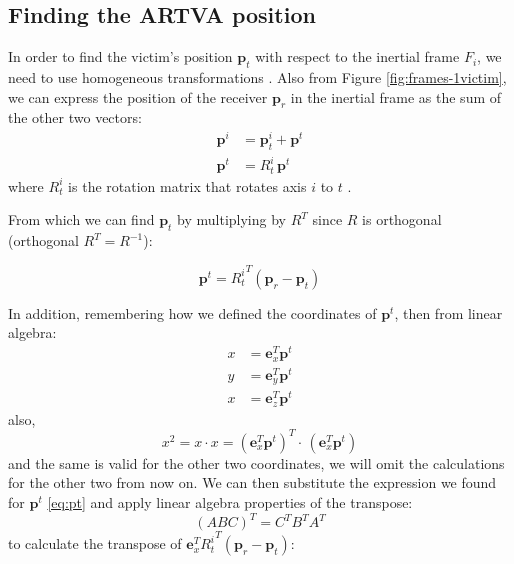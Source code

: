 \subsection{Finding the ARTVA position}
In order to find the victim's position $\mathbf{p}_t$ with respect to the inertial frame $F_i$, we need to use homogeneous transformations \cite{book-robotics}. Also from Figure \ref{fig:frames-1victim}, we can express the position of the receiver $\mathbf{p}_r$ in the inertial frame as the sum of the other two vectors:
\[
\begin{aligned}
\mathbf{p}^i &= \mathbf{p}_t^i + \mathbf{p}^t \\
\mathbf{p}^t &= R_t^i \, \mathbf{p}^t
\end{aligned}
\]
where $R_t^i$ is the rotation matrix that rotates axis $i$ to $t$ \cite{artva-gazebo}.

From which we can find $\mathbf{p}_t$ by multiplying by $R^T$ since $R$ is orthogonal (orthogonal $R^T = R^{-1}$):

\begin{equation}
    \mathbf{p}^t = {R_t^i}^T (\mathbf{p}_r - \mathbf{p}_t)
    \label{eq:pt}
\end{equation}

In addition, remembering how we defined the coordinates of $\mathbf{p}^t$, then from linear algebra:
\[
\begin{aligned}
x &= \mathbf{e}_x^T \mathbf{p}^t \\
y &= \mathbf{e}_y^T \mathbf{p}^t \\
x  &= \mathbf{e}_z^T \mathbf{p}^t
\end{aligned}
\]
also,
\[
x^2 = x \cdot x = \left( \mathbf{e}_x^T \mathbf{p}^t \right)^T \cdot \, \left( \mathbf{e}_x^T \mathbf{p}^t \right)
\]
and the same is valid for the other two coordinates, we will omit the calculations for the other two from now on. We can then substitute the expression we found for $\mathbf{p}^t$ \ref{eq:pt} and apply linear algebra properties of the transpose:
$$(ABC)^T = C^T B^T A^T$$ to calculate the transpose of $\mathbf{e}_x^T {R_t^i}^T (\mathbf{p}_r - \mathbf{p}_t)$:

